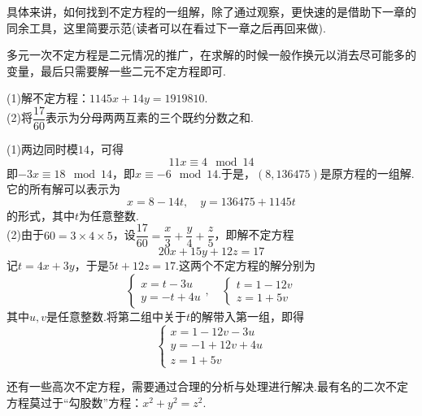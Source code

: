 具体来讲，如何找到不定方程的一组解，除了通过观察，更快速的是借助下一章的同余工具，这里简要示范(读者可以在看过下一章之后再回来做).

多元一次不定方程是二元情况的推广，在求解的时候一般作换元以消去尽可能多的变量，最后只需要解一些二元不定方程即可.

\begin{example}
	(1)解不定方程：$1145x+14y=1919810$. \\
	(2)将$\dfrac{17}{60}$表示为分母两两互素的三个既约分数之和.
\end{example}
\begin{solution}
	(1)两边同时模$14$，可得$$11x \equiv 4 \mod 14$$
	即$-3x \equiv 18 \mod 14$，即$x \equiv -6 \mod 14$.于是，$(8,136475)$是原方程的一组解.它的所有解可以表示为$$x=8-14t,\quad y=136475+1145t$$
	的形式，其中$t$为任意整数. \\
	(2)由于$60=3 \times 4 \times 5$，设$\dfrac{17}{60} = \dfrac{x}{3} + \dfrac{y}{4} + \dfrac{z}{5}$，即解不定方程$$20x+15y+12z=17$$
	记$t=4x+3y$，于是$5t+12z=17$.这两个不定方程的解分别为$$\begin{cases}
		x=t-3u \\ y=-t+4u
	\end{cases}, \quad \begin{cases}
		t=1-12v \\ z=1+5v
	\end{cases}$$
	其中$u,v$是任意整数.将第二组中关于$t$的解带入第一组，即得$$\begin{cases}
		x=1-12v-3u \\ y=-1+12v+4u \\ z=1+5v
	\end{cases}$$
\end{solution}

还有一些高次不定方程，需要通过合理的分析与处理进行解决.最有名的二次不定方程莫过于“勾股数”方程：$x^2+y^2=z^2$.

